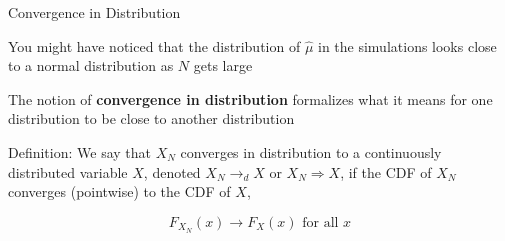 \documentclass[11pt,english,handout]{beamer}
\newenvironment{wideitemize}{\itemize\addtolength{\itemsep}{10pt}}{\enditemize}
\begin{document}
\begin{frame}{Convergence in Distribution}
	
	\begin{wideitemize}

		\item
		You might have noticed that the distribution of $\hat\mu$ in the simulations looks close to a normal distribution as $N$ gets large
		
		\item
		The notion of \textbf{convergence in distribution} formalizes what it means for one distribution to be close to another distribution
		
		
		\pause
		\item
		Definition: We say that $X_N$ converges in distribution to a continuously distributed variable $X$, denoted $X_N \rightarrow_d X$ or $X_N \Rightarrow X$, if the CDF of $X_N$ converges (pointwise) to the CDF of $X$,
		
		$$F_{X_N}(x) \rightarrow F_{X}(x) \text{ for all } x$$ 
		
		
%		
	\end{wideitemize}
	
\end{frame}
\end{document}

